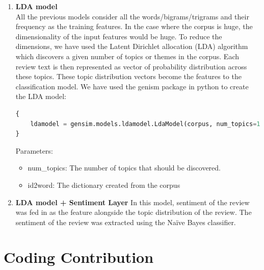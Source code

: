 \documentclass[paper=a4, fontsize=11pt]{scrartcl} %
\numberwithin{equation}{section} %
\numberwithin{figure}{section} %
\numberwithin{table}{section} %
\begin{document}
\begin{enumerate}
\item \textbf{LDA model}\\
All the previous models consider all the words/bigrams/trigrams and their frequency as the training features. In the case where the corpus is huge, the dimensionality of the input features would be huge. To reduce the dimensions, we have used the Latent Dirichlet allocation (LDA) algorithm which discovers a given number of topics or themes in the corpus. Each review text is then represented as vector of probability distribution across these topics. These topic distribution vectors become the features to the classification model.
We have used the genism package in python to create the LDA model:
\begin{lstlisting}[language=python]
{
	ldamodel = gensim.models.ldamodel.LdaModel(corpus, num_topics=15, id2word = dictionary)
}
\end{lstlisting}

Parameters:
\begin{itemize}
\item num\_topics:  The number of topics that should be discovered.
\item id2word: The dictionary created from the corpus
\end{itemize}

\item \textbf{LDA model + Sentiment Layer}
In this model, sentiment of the review was fed in as the feature alongside the topic distribution of the review. The sentiment of the review was extracted using the Naïve Bayes classifier. 
\end{enumerate}

\section{Coding Contribution}
\end{document}
